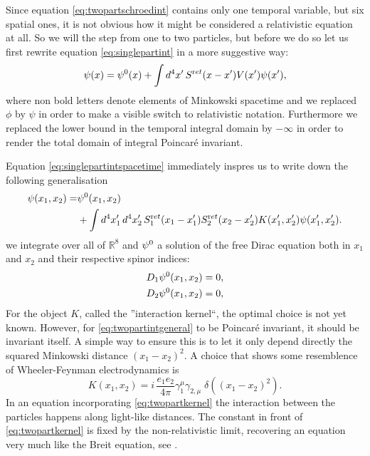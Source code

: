 \documentclass[b5paper,draft,openbib,12pt]{memoir}
\begin{document}
Since equation \eqref{eq:twopartschroedint} contains only one temporal variable, but six spatial ones,
it is not obvious how it might be considered a relativistic equation at all. So we will 
the step from one to two particles, but before we do so let us first rewrite equation 
\eqref{eq:singlepartint} in a more suggestive way:
\begin{equation}
	\psi(x) = \psi^{0}(x) + \int d^4 x' \, S^{\textup ret}(x-x') V(x') \psi(x'),
	\label{eq:singlepartintspacetime}
\end{equation}
where non bold letters denote elements of Minkowski spacetime and we replaced \(\phi\)
by \(\psi\) in order to make a visible switch to relativistic notation. 
Furthermore we replaced the lower bound in the temporal integral domain by \(-\infty\)
in order to render the total domain of integral Poincaré invariant.

Equation \eqref{eq:singlepartintspacetime} immediately inspres us to write down the
following generalisation
\begin{align}\label{eq:twopartintgeneral}
  \psi(x_1,x_2) = &\psi^{0}(x_1,x_2) \\\nonumber
  &+ \int d^4 x_1'\, d^4 x_2' \, S^{\textup ret}_1(x_1-x_1') S^{\textup ret}_2(x_2-x_2') K(x_1',x_2') \psi(x_1',x_2').
\end{align}
we integrate over all of \(\mathbb{R}^8\) and \(\psi^{0}\) a solution of the free 
Dirac equation both in \(x_1\) and \(x_2\) and their respective spinor indices:
\begin{align}
  D_1  \psi^{0}(x_1,x_2) = 0,\\
  D_2  \psi^{0}(x_1,x_2) = 0,
	\label{eq:freemultitime}
\end{align}
For the object \(K\), called the ''interaction kernel``, the optimal choice is not yet known.
However, for \eqref{eq:twopartintgeneral} to be Poincaré invariant, it should be invariant
itself. A simple way to ensure this is to let it only depend directly 
the squared Minkowski distance \((x_1-x_2)^2\). A choice that shows some resemblence of 
Wheeler-Feynman electrodynamics is
\begin{equation}
	K(x_1,x_2) = i\, \frac{e_1e_2}{4\pi} \gamma_1^\mu \gamma_{2,\mu} \; \delta((x_1-x_2)^2).
	\label{eq:twopartkernel}
\end{equation}
In an equation incorporating \eqref{eq:twopartkernel} the interaction between the particles 
happens along light-like distances. The constant in front of \eqref{eq:twopartkernel}
is fixed by the non-relativistic limit, recovering an equation very much like the Breit equation,
see \cite[section 3.6]{lienertfirst}.
\end{document}
